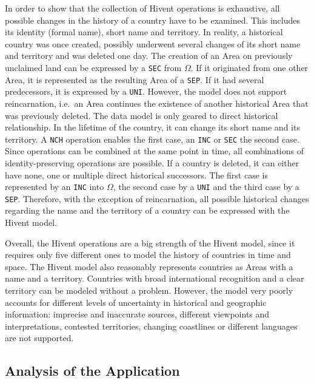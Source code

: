 In order to show that the collection of Hivent operations is exhaustive, all possible changes in the history of a country have to be examined. This includes its identity (formal name), short name and territory. In reality, a historical country was once created, possibly underwent several changes of its short name and territory and was deleted one day. The creation of an Area on previously unclaimed land can be expressed by a \texttt{SEC} from $\Omega$. If it originated from one other Area, it is represented as the resulting Area of a \texttt{SEP}. If it had several predecessors, it is expressed by a \texttt{UNI}. However, the model does not support reincarnation, i.e.\ an Area continues the existence of another historical Area that was previously deleted. The data model is only geared to direct historical relationship. In the lifetime of the country, it can change its short name and its territory. A \texttt{NCH} operation enables the first case, an \texttt{INC} or \texttt{SEC} the second case. Since operations can be combined at the same point in time, all combinations of identity-preserving operations are possible. If a country is deleted, it can either have none, one or multiple direct historical successors. The first case is represented by an \texttt{INC} into $\Omega$, the second case by a \texttt{UNI} and the third case by a \texttt{SEP}. Therefore, with the exception of reincarnation, all possible historical changes regarding the name and the territory of a country can be expressed with the Hivent model.


Overall, the Hivent operations are a big strength of the Hivent model, since it requires only five different ones to model the history of countries in time and space.
The Hivent model also reasonably represents countries as Areas with a name and a territory. Countries with broad international recognition and a clear territory can be modeled without a problem. However, the model very poorly accounts for different levels of uncertainty in historical and geographic information: imprecise and inaccurate sources, different viewpoints and interpretations, contested territories, changing coastlines or different languages are not supported.



\subsection{Analysis of the Application} %
\label{sub:application}


